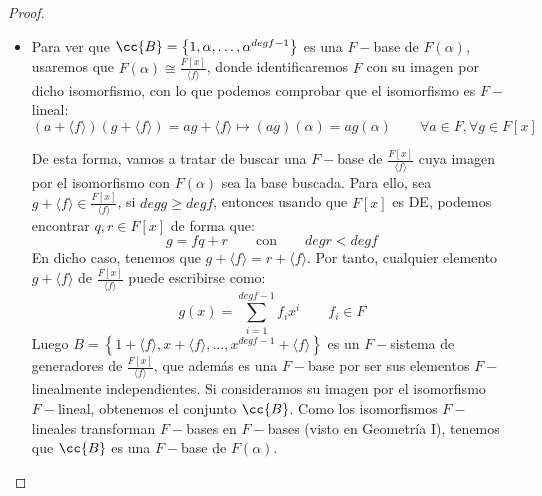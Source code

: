 \begin{prop}
\begin{proof}
\begin{itemize}
                de donde:
                \begin{equation*}
                    g(\alpha) = \sum_{i=1}^{n} g_i \alpha^i
                \end{equation*}
                Con $g_i \in F$ y $\alpha \in F(\alpha)$, luego $g(\alpha) \in F(\alpha)$, lo que nos da la inclusión $Im e_\alpha\subseteq F(\alpha)$ que nos faltaba. En definitiva:
                \begin{equation*}
                    F(\alpha) = Im e_\alpha \cong \dfrac{F[x]}{\langle f \rangle }
                \end{equation*}
            \item Para ver que $\cc{B}=\left\{1,\alpha,\ldots, \alpha^{degf-1}\right\}$ es una $F-$base de $F(\alpha)$, usaremos que $F(\alpha)\cong \frac{F[x]}{\langle f \rangle }$, donde identificaremos $F$ con su imagen por dicho isomorfismo, con lo que podemos comprobar que el isomorfismo es $F-$lineal:
                \begin{equation*}
                    (a+\langle f \rangle )(g+\langle f \rangle ) = ag+\langle f \rangle  \longmapsto (ag)(\alpha) = ag(\alpha) \qquad \forall a\in F, \forall g\in F[x]
                \end{equation*}

                De esta forma, vamos a tratar de buscar una $F-$base de $\frac{F[x]}{\langle f \rangle }$ cuya imagen por el isomorfismo con $F(\alpha)$ sea la base buscada. Para ello, sea $g+\langle f \rangle \in \frac{F[x]}{\langle f \rangle }$, si $deg g \geq deg f$, entonces usando que $F[x]$ es DE, podemos encontrar $q,r\in F[x]$ de forma que:
                \begin{equation*}
                    g = fq + r \qquad \text{con} \qquad degr < degf
                \end{equation*}
                En dicho caso, tenemos que $g+\langle f \rangle = r+ \langle f \rangle $. Por tanto, cualquier elemento $g+\langle f \rangle $ de $\frac{F[x]}{\langle f \rangle }$ puede escribirse como:
                \begin{equation*}
                    g(x) = \sum_{i=1}^{degf-1} f_ix^i \qquad f_i \in F 
                \end{equation*}
                Luego $B=\left\{1+\langle f \rangle,x+\langle f \rangle, \ldots, x^{degf-1}+\langle f \rangle  \right\}$ es un $F-$sistema de generadores de $\frac{F[x]}{\langle f \rangle }$, que además es una $F-$base por ser sus elementos $F-$linealmente independientes. Si consideramos su imagen por el isomorfismo $F-$lineal, obtenemos el conjunto $\cc{B}$. Como los isomorfismos $F-$lineales transforman $F-$bases en $F-$bases (visto en Geometría I), tenemos que $\cc{B}$ es una $F-$base de $F(\alpha)$.
        \end{itemize}
    \end{proof}
\end{prop}


